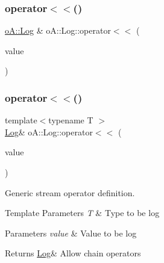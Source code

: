 \mbox{\label{classo_a_1_1_log_ae274c2ff1bc29ba718265e46fcc6207c}} 
\subsubsection{\texorpdfstring{operator$<$$<$()}{operator<<()}\hspace{0.1cm}{\footnotesize\ttfamily [2/9]}}
{\footnotesize\ttfamily \mbox{\hyperlink{classo_a_1_1_log}{o\+A\+::\+Log}} \& o\+A\+::\+Log\+::operator$<$$<$ (\begin{DoxyParamCaption}\item[{const char $\ast$const}]{value }\end{DoxyParamCaption})}

\mbox{\label{classo_a_1_1_log_a6ce6d2f750bf3baeda1c2541617e4952}} 
\subsubsection{\texorpdfstring{operator$<$$<$()}{operator<<()}\hspace{0.1cm}{\footnotesize\ttfamily [3/9]}}
{\footnotesize\ttfamily template$<$typename T $>$ \\
\mbox{\hyperlink{classo_a_1_1_log}{Log}}\& o\+A\+::\+Log\+::operator$<$$<$ (\begin{DoxyParamCaption}\item[{T}]{value }\end{DoxyParamCaption})}



Generic stream operator definition. 


\begin{DoxyTemplParams}{Template Parameters}
{\em T} & Type to be log \\
\hline
\end{DoxyTemplParams}

\begin{DoxyParams}{Parameters}
{\em value} & Value to be log \\
\hline
\end{DoxyParams}
\begin{DoxyReturn}{Returns}
\mbox{\hyperlink{classo_a_1_1_log}{Log}}\& Allow chain operators 
\end{DoxyReturn}
\mbox{\label{classo_a_1_1_log_a54dba53cce06861c82dc760d9c809633}} 
